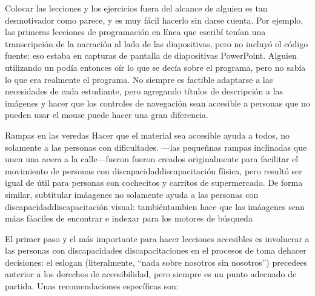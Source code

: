 
Colocar las lecciones y los ejercicios fuera del alcance de alguien es tan desmotivador como parece,
y es muy fácil hacerlo sin darse cuenta.
Por ejemplo,
las primeras lecciones de programación en línea que escribí tenían una transcripción de la narración
al lado de las diapositivas,
pero no incluyó el código fuente:
eso estaba en capturas de pantalla de diapositivas PowerPoint.
Alguien utilizando un 
podía entonces oír lo que se decía sobre el programa,
pero no sabía lo que era realmente el programa.
No siempre es factible adaptarse a las necesidades de cada estudiante,
pero agregando títulos de descripción a las imágenes
y hacer que los controles de navegación sean accesible a personas que no pueden usar el mouse
puede hacer una gran diferencia.

\begin{aside}{Rampas en las veredas}
  Hacer que el material sea accesible ayuda a todos,
  no solamente a las personas con dificultades.
---las pequeñnas rampas inclinadas que unen una acera a la calle---fueron
  fueron creados originalmente para facilitar el movimiento de personas con discapacidaddiscapacitación fíisica,
  pero resultó ser igual de útil para personas con cochecitos y carritos de supermercado.
  De forma similar,
  subtitular imáagenes no solamente ayuda a las personas con discapacidaddiscapacitación visual:
  tambiéntambien hace que las imáagenes sean máas fáaciles de encontrar e indexar para los motores de búsqueda
\end{aside}

El primer paso y el más importante para hacer lecciones accesibles es
involucrar a las personas con discapacidades discapacitaciones en el procesos de toma dehacer decisiones:
el eslogan \emph{}
(literalmente, ``nada sobre nosotros sin nosotros'')
precedees anterior a los derechos de accesibilidad,
pero siempre es un punto adecuado de partida.
Unas recomendaciones específicas son:


